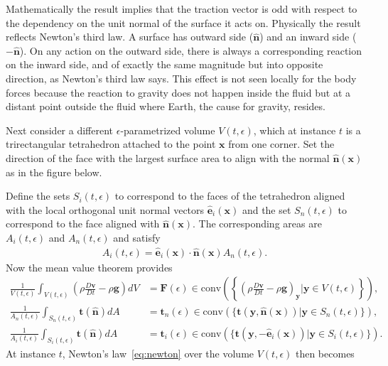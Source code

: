 \begin{example}
    Mathematically the result implies that the traction vector is odd with respect to the dependency on the unit normal of the surface it acts on. Physically the result reflects Newton's third law. A surface has outward side ($\bm{\hat{n}}$) and an inward side ($-\bm{\hat{n}}$). On any action on the outward side, there is always a corresponding reaction on the inward side, and of exactly the same magnitude but into opposite direction, as Newton's third law says. This effect is not seen locally for the body forces because the reaction to gravity does not happen inside the fluid but at a distant point outside the fluid where Earth, the cause for gravity, resides.

    Next consider a different $\epsilon$-parametrized volume $V(t,\epsilon)$, which at instance $t$ is a trirectangular tetrahedron attached to the point $\bm{x}$ from one corner. Set the direction of the face with the largest surface area to align with the normal $\bm{\hat{n}}(\bm{x})$ as in the figure below.
    \begin{center}
        
    \end{center}
    Define the sets $S_i(t,\epsilon)$ to correspond to the faces of the tetrahedron aligned with the local orthogonal unit normal vectors $\bm{\hat{e}}_i(\bm{x})$ and the set $S_n(t,\epsilon)$ to correspond to the face aligned with $\bm{\hat{n}}(\bm{x})$. The corresponding areas are $A_i(t,\epsilon)$ and $A_n(t,\epsilon)$ and satisfy
    \begin{align*}
        A_i(t,\epsilon)=\bm{\hat{e}}_i(\bm{x})\cdot\bm{\hat{n}}(\bm{x})A_n(t,\epsilon).
    \end{align*}
    Now the mean value theorem provides
     \begin{align*}
        \frac{1}{V(t,\epsilon)}\int_{V(t,\epsilon)}\left(\rho\frac{D\bm{v}}{Dt}-\rho\bm{g}\right)dV&=\bm{F}(\epsilon)\in \text{conv}\left(\left\{\left(\rho\frac{D\bm{v}}{Dt}-\rho\bm{g}\right)_{\bm{y}}|\bm{y}\in V(t,\epsilon)\right\}\right),
        \\
        \frac{1}{A_n(t,\epsilon)}\int_{S_n(t,\epsilon)}\bm{t}(\bm{\hat{n}})dA&= \bm{t}_n(\epsilon)\in \text{conv}(\{\bm{t}(\bm{y},\bm{\hat{n}}(\bm{x}))|\bm{y}\in S_n(t,\epsilon)\}),
        \\
        \frac{1}{A_i(t,\epsilon)}\int_{S_i(t,\epsilon)}\bm{t}(\bm{\hat{n}})dA&=\bm{t}_i(\epsilon)\in \text{conv}(\{\bm{t}(\bm{y},-\bm{\hat{e}}_i(\bm{x}))|\bm{y}\in S_i(t,\epsilon)\}).
    \end{align*}
    At instance $t$, Newton's law~\eqref{eq:newton} over the volume $V(t,\epsilon)$ then becomes

\end{example}
